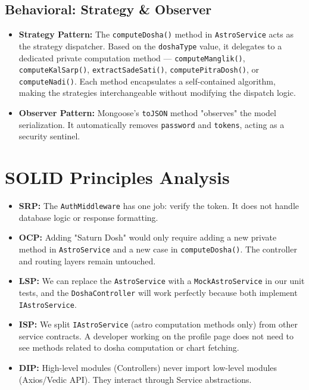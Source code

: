 \documentclass[12pt,a4paper]{article}
\begin{document}
\subsection{Behavioral: Strategy \& Observer}
\begin{itemize}
    \item \textbf{Strategy Pattern:} The \texttt{computeDosha()} method in \texttt{AstroService} acts as the strategy dispatcher. Based on the \texttt{doshaType} value, it delegates to a dedicated private computation method --- \texttt{computeManglik()}, \texttt{computeKalSarp()}, \texttt{extractSadeSati()}, \texttt{computePitraDosh()}, or \texttt{computeNadi()}. Each method encapsulates a self-contained algorithm, making the strategies interchangeable without modifying the dispatch logic.
    \item \textbf{Observer Pattern:} Mongoose's \texttt{toJSON} method "observes" the model serialization. It automatically removes \texttt{password} and \texttt{tokens}, acting as a security sentinel.
\end{itemize}

\section{SOLID Principles Analysis}
\begin{itemize}
    \item \textbf{SRP:} The \texttt{AuthMiddleware} has one job: verify the token. It does not handle database logic or response formatting.
    \item \textbf{OCP:} Adding "Saturn Dosh" would only require adding a new private method in \texttt{AstroService} and a new case in \texttt{computeDosha()}. The controller and routing layers remain untouched.
    \item \textbf{LSP:} We can replace the \texttt{AstroService} with a \texttt{MockAstroService} in our unit tests, and the \texttt{DoshaController} will work perfectly because both implement \texttt{IAstroService}.
    \item \textbf{ISP:} We split \texttt{IAstroService} (astro computation methods only) from other service contracts. A developer working on the profile page does not need to see methods related to dosha computation or chart fetching.
    \item \textbf{DIP:} High-level modules (Controllers) never import low-level modules (Axios/Vedic API). They interact through Service abstractions.
\end{itemize}
\end{document}
